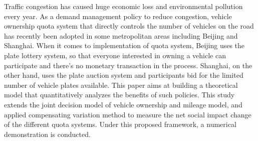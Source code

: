 Traffic congestion has caused huge economic loss and environmental pollution every year. As a demand management policy to reduce congestion, vehicle ownership quota system that directly controls the number of vehicles on the road has recently been adopted in some metropolitan areas including Beijing and Shanghai. When it comes to implementation of quota system, Beijing uses the plate lottery system, so that everyone interested in owning a vehicle can participate and there's no monetary transaction in the process. Shanghai, on the other hand, uses the plate auction system and participants bid for the limited number of vehicle plates available. This paper aims at building a theoretical model that quantitatively analyzes the benefits of such policies. This study extends the joint decision model of vehicle ownership and mileage model, and applied compensating variation method to measure the net social impact change of the different quota systems. Under this proposed framework, a numerical demonstration is conducted.
